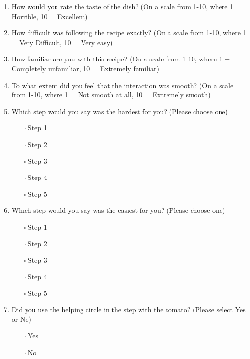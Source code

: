 \begin{enumerate}
    \item How would you rate the taste of the dish? (On a scale from 1-10, where 1 = Horrible, 10 = Excellent)
    
    \item How difficult was following the recipe exactly? (On a scale from 1-10, where 1 = Very Difficult, 10 = Very easy)
    
    \item How familiar are you with this recipe? (On a scale from 1-10, where 1 = Completely unfamiliar, 10 = Extremely familiar)
    
    \item To what extent did you feel that the interaction was smooth? (On a scale from 1-10, where 1 = Not smooth at all, 10 = Extremely smooth)
    
    \item Which step would you say was the hardest for you? (Please choose one)\\
    \begin{itemize}
        \item[$\square$] Step 1
        \item[$\square$] Step 2
        \item[$\square$] Step 3
        \item[$\square$] Step 4
        \item[$\square$] Step 5
    \end{itemize}
    
    \item Which step would you say was the easiest for you? (Please choose one)\\
    \begin{itemize}
        \item[$\square$] Step 1
        \item[$\square$] Step 2
        \item[$\square$] Step 3
        \item[$\square$] Step 4
        \item[$\square$] Step 5
    \end{itemize}
    
    \item Did you use the helping circle in the step with the tomato? (Please select Yes or No)\\
    \begin{itemize}
        \item[$\square$] Yes
        \item[$\square$] No
    \end{itemize}
    

\end{enumerate}
